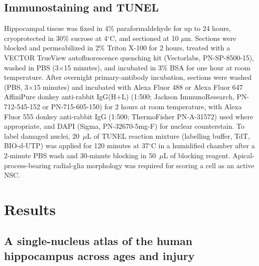 \documentclass[11pt]{article}
\begin{document}
\subsection{Immunostaining and TUNEL}

Hippocampal tissue was fixed in 4\% paraformaldehyde for up to 24 hours,
cryoprotected in 30\% sucrose at 4$^\circ$C, and sectioned at 10 $\mu$m.
Sections were blocked and permeabilized in 2\% Triton X-100 for 2 hours,
treated with a VECTOR TrueView autofluorescence quenching kit
(Vectorlabs, PN-SP-8500-15), washed in PBS (3$\times$15 minutes), and
incubated in 3\% BSA for one hour at room temperature. After overnight
primary-antibody incubation, sections were washed (PBS, 3$\times$15 minutes)
and incubated with Alexa Fluor 488 or Alexa Fluor 647 AffiniPure donkey
anti-rabbit IgG(H+L) (1:500; Jackson ImmunoResearch, PN-712-545-152 or
PN-715-605-150) for 2 hours at room temperature, with Alexa Fluor 555
donkey anti-rabbit IgG (1:500; ThermoFisher PN-A-31572) used where
appropriate, and DAPI (Sigma, PN-32670-5mg-F) for nuclear counterstain.
To label damaged nuclei, 20~$\mu$L of TUNEL reaction mixture (labelling
buffer, TdT, BIO-d-UTP) was applied for 120 minutes at 37$^\circ$C in a
humidified chamber after a 2-minute PBS wash and 30-minute blocking in
50~$\mu$L of blocking reagent. Apical-process-bearing radial-glia
morphology was required for scoring a cell as an active NSC.

\section{Results}

\subsection{A single-nucleus atlas of the human hippocampus across ages and
injury}
\end{document}
